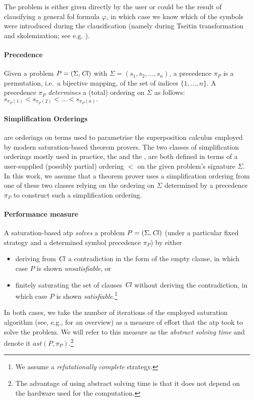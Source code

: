 The problem is either given directly by the user or 
could be the result of clausifying a general \gls{fol} formula \(\varphi\),
in which case we know which of the symbols were introduced during the clausification
(namely during Tseitin transformation and skolemization; see e.g. \citet{DBLP:books/el/RV01/NonnengartW01}).

\paragraph{Precedence}
Given a problem \(P = (\Sigma, \operatorname{\mathit{Cl}})\) with \(\Sigma = (s_1, s_2, \ldots, s_n)\),
a precedence \(\pi_P\) is a permutation, i.e.~a bijective mapping, of the set of indices \(\{1,\ldots,n\}\).
A precedence \(\pi_P\) \emph{determines} a (total) ordering on \(\Sigma\) as follows:
\(s_{\pi_P(1)} < s_{\pi_P(2)} < \ldots < s_{\pi_P(n)}.\)

\paragraph{Simplification Orderings} are orderings on terms used to parametrise the superposition calculus \cite{Nieuwenhuis2001}
employed by modern saturation-based theorem provers. The two classes of simplification orderings mostly used in practice,
the  \cite{Knuth1983} and the  \cite{Kamin1980}, are both defined in terms 
of a user-supplied (possibly partial) ordering $<$ %
on the given problem's signature \(\Sigma\).
In this work, we assume that a theorem prover uses a simplification ordering from one of these two classes
relying on the ordering on \(\Sigma\) determined by a precedence \(\pi_P\) to construct such a simplification ordering.

\paragraph{Performance measure} A saturation-based \gls{atp} \emph{solves} a problem \(P = (\Sigma,\operatorname{\mathit{Cl}})\)
(under a particular fixed strategy and a determined symbol precedence \(\pi_P\))  by either
\begin{itemize}
\item
	deriving from \(\operatorname{\mathit{Cl}}\) a contradiction in the form of the empty clause,
	in which case \(P\) is shown \emph{unsatisfiable}, or
\item
	finitely saturating the set of clauses \(\operatorname{\mathit{Cl}}\) without deriving the contradiction,
	in which case \(P\) is shown \emph{satisfiable}.\footnote{We assume a \emph{refutationally complete} strategy.}	
\end{itemize}
In both cases, we take the number of iterations of the employed saturation algorithm (see, e.g., \citet{DBLP:journals/jsc/RiazanovV03} for an overview) as a measure of effort that the \gls{atp} took to solve the problem.
We will refer to this measure as the \emph{abstract solving time} and denote it \(\mathit{ast}(P,\pi_P)\).\footnote{
The advantage of using abstract solving time is that it does not depend on the hardware used for the computation.}

